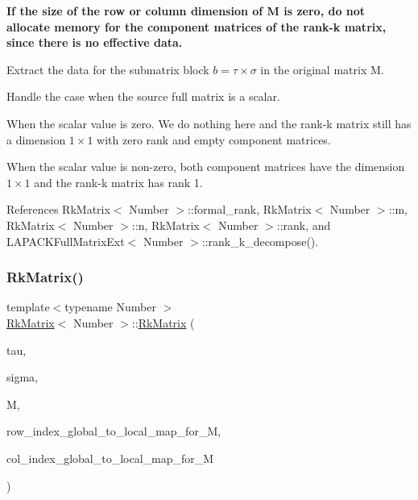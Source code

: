 {\bfseries If the size of the row or column dimension of {\ttfamily M} is zero, do not allocate memory for the component matrices of the rank-\/k matrix, since there is no effective data.}

Extract the data for the submatrix block $b = \tau \times \sigma$ in the original matrix {\ttfamily M}.

Handle the case when the source full matrix is a scalar.

When the scalar value is zero. We do nothing here and the rank-\/k matrix still has a dimension $1 \times 1$ with zero rank and empty component matrices.

When the scalar value is non-\/zero, both component matrices have the dimension $1 \times 1$ and the rank-\/k matrix has rank 1.

References Rk\+Matrix$<$ Number $>$\+::formal\+\_\+rank, Rk\+Matrix$<$ Number $>$\+::m, Rk\+Matrix$<$ Number $>$\+::n, Rk\+Matrix$<$ Number $>$\+::rank, and L\+A\+P\+A\+C\+K\+Full\+Matrix\+Ext$<$ Number $>$\+::rank\+\_\+k\+\_\+decompose().

\mbox{\label{classRkMatrix_aee16f709a7a73d022add2f044cdcb26a}} 
\subsubsection{\texorpdfstring{Rk\+Matrix()}{RkMatrix()}\hspace{0.1cm}{\footnotesize\ttfamily [8/18]}}
{\footnotesize\ttfamily template$<$typename Number $>$ \\
\hyperlink{classRkMatrix}{Rk\+Matrix}$<$ Number $>$\+::\hyperlink{classRkMatrix}{Rk\+Matrix} (\begin{DoxyParamCaption}\item[{const std\+::vector$<$ types\+::global\+\_\+dof\+\_\+index $>$ \&}]{tau,  }\item[{const std\+::vector$<$ types\+::global\+\_\+dof\+\_\+index $>$ \&}]{sigma,  }\item[{const \hyperlink{classLAPACKFullMatrixExt}{L\+A\+P\+A\+C\+K\+Full\+Matrix\+Ext}$<$ Number $>$ \&}]{M,  }\item[{const std\+::map$<$ types\+::global\+\_\+dof\+\_\+index, size\+\_\+t $>$ \&}]{row\+\_\+index\+\_\+global\+\_\+to\+\_\+local\+\_\+map\+\_\+for\+\_\+M,  }\item[{const std\+::map$<$ types\+::global\+\_\+dof\+\_\+index, size\+\_\+t $>$ \&}]{col\+\_\+index\+\_\+global\+\_\+to\+\_\+local\+\_\+map\+\_\+for\+\_\+M }\end{DoxyParamCaption})}

